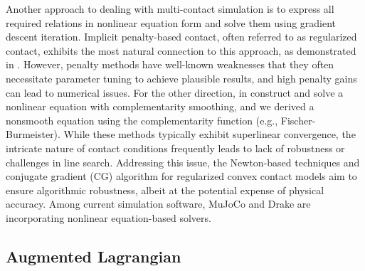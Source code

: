 Another approach to dealing with multi-contact simulation is to express all required relations in nonlinear equation form and solve them using gradient descent iteration. 
Implicit penalty-based contact, often referred to as regularized contact, exhibits the most natural connection to this approach, as demonstrated in \cite{geilinger2020add,castro2020transition}. 
However, penalty methods have well-known weaknesses that they often necessitate parameter tuning to achieve plausible results, and high penalty gains can lead to numerical issues.
For the other direction, in \cite{howell2022dojo} construct and solve a nonlinear equation with complementarity smoothing, and \cite{macklin2019nonsmooth} we derived a nonsmooth equation using the complementarity function (e.g., Fischer-Burmeister).
While these methods typically exhibit superlinear convergence, the intricate nature of contact conditions frequently leads to lack of robustness or challenges in line search. 
Addressing this issue, the Newton-based techniques \cite{castro2022unconstrained} and conjugate gradient (CG) algorithm for regularized convex contact models aim to ensure algorithmic robustness, albeit at the potential expense of physical accuracy. 
Among current simulation software, MuJoCo and Drake \cite{drake} are incorporating nonlinear equation-based solvers.


\begin{table}[t]
\centering
\caption{Comparison of contact models and solvers used in popular robotic simulators.}
\renewcommand{\arraystretch}{2.0}{
}
\label{table:simulator_compare}
\end{table}


\subsection{Augmented Lagrangian}
 
